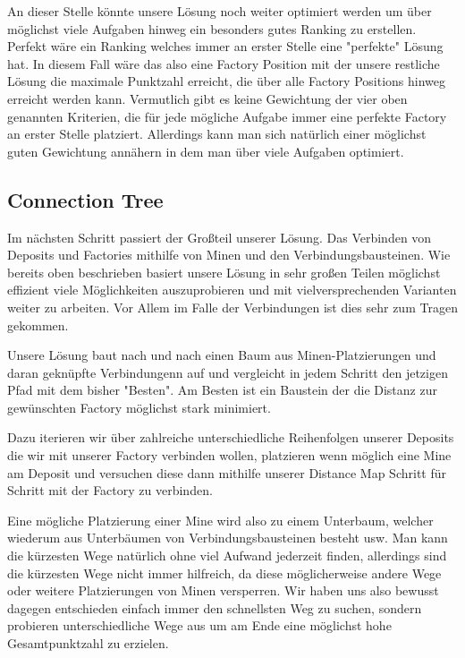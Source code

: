 \documentclass[12pt,a4paper]{article}
\begin{document}
An dieser Stelle könnte unsere Lösung noch weiter optimiert werden um über möglichst viele Aufgaben hinweg ein besonders gutes Ranking zu erstellen. Perfekt wäre ein Ranking welches immer an erster Stelle eine "perfekte" Lösung hat. In diesem Fall wäre das also eine Factory Position mit der unsere restliche Lösung die maximale Punktzahl erreicht, die über alle Factory Positions hinweg erreicht werden kann. Vermutlich gibt es keine Gewichtung der vier oben genannten Kriterien, die für jede mögliche Aufgabe immer eine perfekte Factory an erster Stelle platziert. Allerdings kann man sich natürlich einer möglichst guten Gewichtung annähern in dem man über viele Aufgaben optimiert.

\subsection{Connection Tree}
Im nächsten Schritt passiert der Großteil unserer Lösung. Das Verbinden von Deposits und Factories mithilfe von Minen und den Verbindungsbausteinen. Wie bereits oben beschrieben basiert unsere Lösung in sehr großen Teilen möglichst effizient viele Möglichkeiten auszuprobieren und mit vielversprechenden Varianten weiter zu arbeiten. Vor Allem im Falle der Verbindungen ist dies sehr zum Tragen gekommen.

Unsere Lösung baut nach und nach einen Baum aus Minen-Platzierungen und daran geknüpfte Verbindungenn auf und vergleicht in jedem Schritt den jetzigen Pfad mit dem bisher "Besten". Am Besten ist ein Baustein der die Distanz zur gewünschten Factory möglichst stark minimiert. 

Dazu iterieren wir über zahlreiche unterschiedliche Reihenfolgen unserer Deposits die wir mit unserer Factory verbinden wollen, platzieren wenn möglich eine Mine am Deposit und versuchen diese dann mithilfe unserer Distance Map Schritt für Schritt mit der Factory zu verbinden.

Eine mögliche Platzierung einer Mine wird also zu einem Unterbaum, welcher wiederum aus Unterbäumen von Verbindungsbausteinen besteht usw. Man kann die kürzesten Wege natürlich ohne viel Aufwand jederzeit finden, allerdings sind die kürzesten Wege nicht immer hilfreich, da diese möglicherweise andere Wege oder weitere Platzierungen von Minen versperren. Wir haben uns also bewusst dagegen entschieden einfach immer den schnellsten Weg zu suchen, sondern probieren unterschiedliche Wege aus um am Ende eine möglichst hohe Gesamtpunktzahl zu erzielen.

\end{document}
